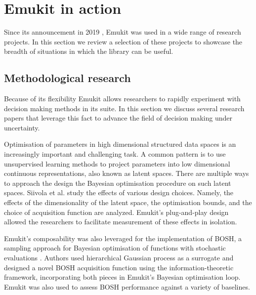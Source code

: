 
\section{Emukit in action}
Since its announcement in 2019 \cite{paleyes2019emulation}, Emukit was used in a wide range of research projects. In this section we review a selection of these projects to showcase the breadth of situations in which the library can be useful.

\subsection{Methodological research}
Because of its flexibility Emukit allows researchers to rapidly experiment with decision making methods in its suite. In this section we discuss several research papers that leverage this fact to advance the field of decision making under uncertainty.

Optimisation of parameters in high dimensional structured data spaces is an increasingly important and challenging task. A common pattern is to use unsupervised learning methods to project parameters into low dimensional continuous representations, also known as latent spaces. There are multiple ways to approach the design the Bayesian optimisation procedure on such latent spaces. Siivola et al. \cite{siivola2021good} study the effects of various design choices. Namely, the effects of the dimensionality of the latent space, the optimisation bounds, and the choice of acquisition function are analyzed. Emukit's plug-and-play design allowed the researchers to facilitate measurement of these effects in isolation.

Emukit's composability was also leveraged for the implementation of BOSH, a sampling approach for Bayesian optimisation of functions with stochastic evaluations \cite{moss2020bosh}. Authors used hierarchical Gaussian process as a surrogate and designed a novel BOSH acquisition function using the information-theoretic framework, incorporating both pieces in Emukit's Bayesian optimisation loop. Emukit was also used to assess BOSH performance against a variety of baselines.


